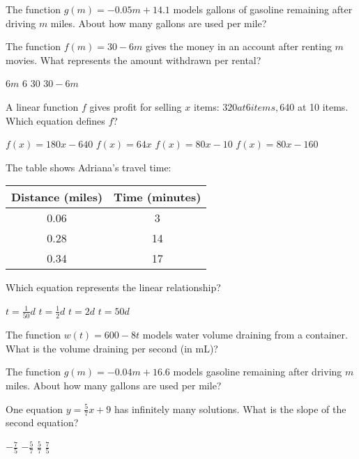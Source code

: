 \documentclass[12pt]{exam}
\begin{document}
\begin{questions}
\question The function $g(m) = -0.05m + 14.1$ models gallons of gasoline remaining after driving $m$ miles. About how many gallons are used per mile?
\begin{choices}
\end{choices}

\question The function $f(m) = 30 - 6m$ gives the money in an account after renting $m$ movies. What represents the amount withdrawn per rental?
\begin{choices}
\choice $6m$
\choice $6$
\choice $30$
\choice $30 - 6m$
\end{choices}

\question A linear function $f$ gives profit for selling $x$ items: $320 at 6 items, $640 at 10 items. Which equation defines $f$?
\begin{choices}
\choice $f(x) = 180x - 640$
\choice $f(x) = 64x$
\choice $f(x) = 80x - 10$
\choice $f(x) = 80x - 160$
\end{choices}

\question The table shows Adriana's travel time:
\begin{center}
\begin{tabular}{|c|c|}
\hline
Distance (miles) & Time (minutes) \\
\hline
0.06 & 3 \\
0.28 & 14 \\
0.34 & 17 \\
\hline
\end{tabular}
\end{center}
Which equation represents the linear relationship?
\begin{choices}
\choice $t = \frac{1}{50}d$
\choice $t = \frac{1}{2}d$
\choice $t = 2d$
\choice $t = 50d$
\end{choices}

\question The function $w(t) = 600 - 8t$ models water volume draining from a container. What is the volume draining per second (in mL)?

\question The function $g(m) = -0.04m + 16.6$ models gasoline remaining after driving $m$ miles. About how many gallons are used per mile?
\begin{choices}
\end{choices}

\question One equation $y = \frac{5}{7}x + 9$ has infinitely many solutions. What is the slope of the second equation?
\begin{choices}
\choice $-\frac{7}{5}$
\choice $-\frac{5}{7}$
\choice $\frac{5}{7}$
\choice $\frac{7}{5}$
\end{choices}


\end{questions}
\end{document}
